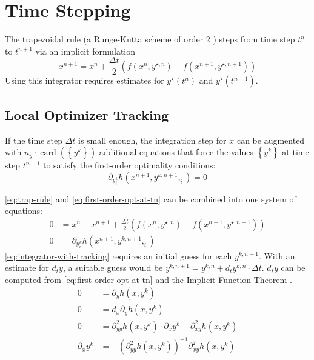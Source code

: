 \documentclass[twoside,leqno, twocolumn]{article}
\DeclareMathOperator{\card}{\mathrm{card}}
\begin{document}
\section{Time Stepping}
The trapezoidal rule (a Runge-Kutta scheme of order 2 \cite{butcherNumericalMethodsOrdinary2008}) steps from time step $t^n$ to $t^{n+1}$ via an implicit formulation
\begin{equation}
	\label{eq:trap-rule}
	x^{n+1} = x^n + \frac{\Delta t}{2}(f(x^n, y^{\star,n})+ f(x^{n+1}, y^{\star,n+1}))
\end{equation}
Using this integrator requires estimates for $y^\star(t^{n})$ and $y^\star(t^{n+1})$.

\subsection{Local Optimizer Tracking}
If the time step $\Delta t$ is small enough, the integration step for $x$ can be augmented with $n_y \cdot \card\left(\left\{y^k\right\}\right)$ additional equations that force the values $\left\{y^k\right\}$ at time step $t^{n+1}$ to satisfy the first-order optimality conditions:
\begin{equation}
	\label{eq:first-order-opt-at-tn}
	\partial_{y^k_i}h\left(x^{n+1}, y^{k,n+1},_i\right) = 0
\end{equation}
	
\eqref{eq:trap-rule} and \eqref{eq:first-order-opt-at-tn} can be combined into one system of equations:
\begin{equation}
	\label{eq:integrator-with-tracking}
	\begin{aligned}
		0 &= x^n - x^{n+1} + \frac{\Delta t}{2}(f(x^n, y^{\star,n})+ f(x^{n+1}, y^{\star,n+1}))\\
		0 &= \partial_{y^k_i}h\left(x^{n+1}, y^{k,n+1},_i\right)
	\end{aligned}
\end{equation}
\eqref{eq:integrator-with-tracking} requires an initial guess for each $y^{k, n+1}$. With an estimate for $d_ty$, a suitable guess would be $y^{k, n+1} = y^{k, n} + d_ty^{k, n}\cdot\Delta t$. $d_ty$ can be computed from \eqref{eq:first-order-opt-at-tn} and the Implicit Function Theorem \cite{deussenNumericalSimulationDifferentialalgebraic2023}.
\begin{equation}
	\label{eq:local-tracking-guess}
	\begin{aligned}
	0&=\partial_{y}h(x, y^k)\\
	0&=d_x\partial_yh(x, y^k)\\
	0&=\partial^2_{yy}h(x, y^k)\cdot\partial_xy^k + \partial^2_{xy}h(x,y^k)\\
	\partial_xy^k &= -\left(\partial^2_{yy}h(x,y^k)\right)^{-1}\partial^2_{xy}h(x, y^k)
	\end{aligned}
\end{equation}
\end{document}
